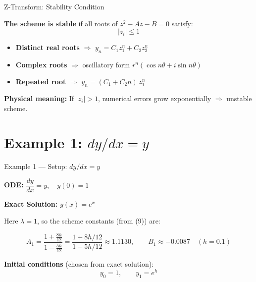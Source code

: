 \documentclass{beamer}
\begin{document}
\begin{frame}{Z-Transform: Stability Condition}

\textbf{The scheme is stable} if all roots of $z^2 - Az - B = 0$ satisfy:
\[
    |z_i| \leq 1
\]

\vspace{0.3cm}
\begin{itemize}
    \item \textbf{Distinct real roots} $\Rightarrow$ $y_n = C_1 z_1^n + C_2 z_2^n$
    \item \textbf{Complex roots} $\Rightarrow$ oscillatory form $r^n(\cos n\theta + i\sin n\theta)$
    \item \textbf{Repeated root} $\Rightarrow$ $y_n = (C_1 + C_2 n)\,z_1^n$
\end{itemize}

\vspace{0.3cm}
\textbf{Physical meaning:}
If $|z_i| > 1$, numerical errors grow exponentially $\Rightarrow$ unstable scheme.

\end{frame}

\section{Example 1: $dy/dx = y$}

\begin{frame}{Example 1 — Setup: $dy/dx = y$}

\textbf{ODE:} $\dfrac{dy}{dx} = y, \quad y(0) = 1$

\textbf{Exact Solution:} $y(x) = e^x$

\vspace{0.3cm}
Here $\lambda = 1$, so the scheme constants (from (9)) are:

\begin{equation}
    A_1 = \frac{1 + \tfrac{8h}{12}}{1 - \tfrac{5h}{12}} = \frac{1 + 8h/12}{1 - 5h/12}
    \approx 1.1130, \qquad B_1 \approx -0.0087 \quad (h=0.1)
\end{equation}

\vspace{0.3cm}
\textbf{Initial conditions} (chosen from exact solution):
\[
    y_0 = 1, \qquad y_1 = e^h
\]

\end{frame}
\end{document}
